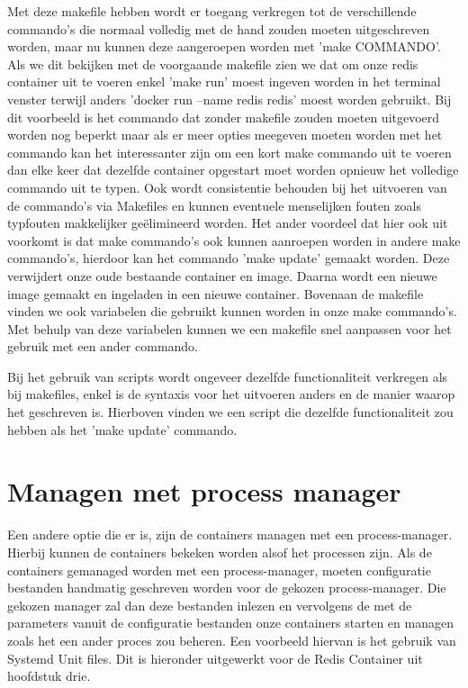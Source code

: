 Met deze makefile hebben wordt er toegang verkregen tot de verschillende commando's die normaal volledig met de hand zouden moeten uitgeschreven worden, maar nu kunnen deze aangeroepen worden met 'make COMMANDO'. Als we dit bekijken met de voorgaande makefile zien we dat om onze redis container uit te voeren enkel 'make run' moest ingeven worden in het terminal venster terwijl anders 'docker run --name redis redis' moest worden gebruikt. Bij dit voorbeeld is het commando dat zonder makefile zouden moeten uitgevoerd worden nog beperkt maar als er meer opties meegeven moeten worden met het commando kan het interessanter zijn  om een kort make commando uit te voeren dan elke keer dat dezelfde container  opgestart moet worden opnieuw het volledige commando uit te typen. Ook wordt consistentie behouden bij het uitvoeren van de commando's via Makefiles en kunnen eventuele menselijken fouten zoals typfouten makkelijker geëlimineerd worden. Het ander voordeel dat hier ook uit voorkomt is dat make commando's ook kunnen aanroepen worden in andere make commando's, hierdoor kan het commando 'make update' gemaakt worden. Deze verwijdert onze oude bestaande container en image. Daarna wordt een nieuwe image gemaakt en ingeladen in een nieuwe container. Bovenaan de makefile vinden we ook variabelen die gebruikt kunnen worden in onze make commando's. Met behulp van deze variabelen kunnen we een makefile snel aanpassen voor het gebruik met een ander commando.


Bij het gebruik van scripts wordt ongeveer dezelfde functionaliteit verkregen als bij makefiles, enkel is de syntaxis voor het uitvoeren anders en de manier waarop het geschreven is. Hierboven vinden we een script die dezelfde functionaliteit zou hebben als het 'make update' commando.



\section{Managen met process manager}

Een andere optie die er is, zijn de containers managen met een process-manager. Hierbij kunnen de containers bekeken worden alsof het processen zijn. Als de  containers gemanaged worden met een process-manager, moeten configuratie bestanden handmatig geschreven worden voor de gekozen process-manager. Die gekozen manager zal dan deze bestanden inlezen en vervolgens de met de parameters vanuit de configuratie bestanden onze containers starten en managen zoals het een ander proces zou beheren. Een voorbeeld hiervan is het gebruik van Systemd Unit files. Dit is hieronder uitgewerkt voor de Redis Container uit hoofdstuk drie.

